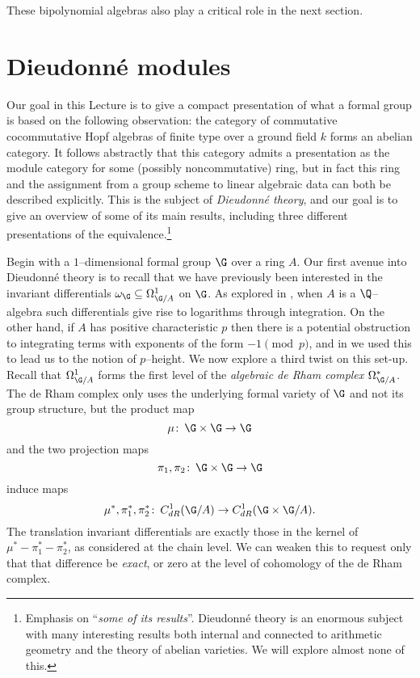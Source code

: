 These bipolynomial algebras also play a critical role in the next section.










\section{Dieudonn\'e modules}\label{SectionDieudonneModules}

Our goal in this Lecture is to give a compact presentation of what a formal group is based on the following observation: the category of commutative cocommutative Hopf algebras of finite type over a ground field $k$ forms an abelian category.  It follows abstractly that this category admits a presentation as the module category for some (possibly noncommutative) ring, but in fact this ring and the assignment from a group scheme to linear algebraic data can both be described explicitly.  This is the subject of \textit{Dieudonn\'e theory}, and our goal is to give an overview of some of its main results, including three different presentations of the equivalence.\footnote{Emphasis on ``\emph{some of its results}''.  Dieudonn\'e theory is an enormous subject with many interesting results both internal and connected to arithmetic geometry and the theory of abelian varieties.  We will explore almost none of this.}

Begin with a $1$--dimensional formal group $\G$ over a ring $A$.  Our first avenue into Dieudonn\'e theory is to recall that we have previously been interested in the invariant differentials $\omega_{\G} \subseteq \Omega^1_{\G/A}$ on $\G$.  As explored in , when $A$ is a $\Q$--algebra such differentials give rise to logarithms through integration.  On the other hand, if $A$ has positive characteristic $p$ then there is a potential obstruction to integrating terms with exponents of the form $-1 \pmod p$, and in  we used this to lead us to the notion of $p$--height.  We now explore a third twist on this set-up.  Recall that $\Omega^1_{\G/A}$ forms the first level of the \textit{algebraic de Rham complex} $\Omega^*_{\G/A}$.  The de Rham complex only uses the underlying formal variety of $\G$ and not its group structure, but the product map \[\mu\co \G \times \G \to \G\] and the two projection maps \[\pi_1, \pi_2\co \G \times \G \to \G\] induce maps \[\mu^*, \pi_1^*, \pi_2^*\co C_{dR}^1(\G/A) \to C_{dR}^1(\G \times \G / A).\]  The translation invariant differentials are exactly those in the kernel of $\mu^* - \pi_1^* - \pi_2^*$, as considered at the chain level.  We can weaken this to request only that that difference be \emph{exact}, or zero at the level of cohomology of the de Rham complex.

